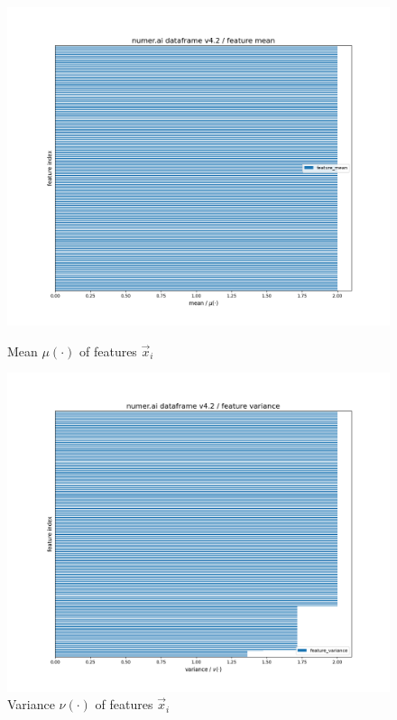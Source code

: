 \documentclass[12pt, a4paper]{article}
\begin{document}
\begin{figure}[htbp]
\begin{minipage}[t]{8.8cm}
\vspace{0pt}
\centering
\includegraphics[width=1\textwidth,trim={0 0 0 0},clip]{figures/train_df_features_mean_horizontal_barplot_2023-11-18.png}
\caption[Mean of Features]{Mean $\mu(\cdot)$ of features $\vec{x}_i$}
\label{fig: features_mean}
\end{minipage}
\hfill
\begin{minipage}[t]{8.8cm}
\vspace{0pt}
\centering
\includegraphics[width=1\textwidth,trim={0 0 0 0},clip]{figures/train_df_features_variance_horizontal_barplot_2023-11-18.png}
\caption[Variance of Features]{Variance $\nu(\cdot)$ of features $\vec{x}_i$ }
\label{fig: features_variance}
\end{minipage}
\end{figure}
\end{document}
